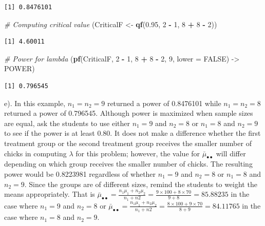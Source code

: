 \documentclass[
]{article}
\newenvironment{Shaded}{\begin{snugshade}}{\end{snugshade}}
\newcommand{\AttributeTok}[1]{\textcolor[rgb]{0.13,0.29,0.53}{#1}}
\newcommand{\CommentTok}[1]{\textcolor[rgb]{0.56,0.35,0.01}{\textit{#1}}}
\newcommand{\ConstantTok}[1]{\textcolor[rgb]{0.56,0.35,0.01}{#1}}
\newcommand{\DecValTok}[1]{\textcolor[rgb]{0.00,0.00,0.81}{#1}}
\newcommand{\FloatTok}[1]{\textcolor[rgb]{0.00,0.00,0.81}{#1}}
\newcommand{\FunctionTok}[1]{\textcolor[rgb]{0.13,0.29,0.53}{\textbf{#1}}}
\newcommand{\NormalTok}[1]{#1}
\newcommand{\OtherTok}[1]{\textcolor[rgb]{0.56,0.35,0.01}{#1}}
\newcommand{\SpecialCharTok}[1]{\textcolor[rgb]{0.81,0.36,0.00}{\textbf{#1}}}
\begin{document}
\begin{verbatim}
[1] 0.8476101
\end{verbatim}

\begin{Shaded}
\begin{Highlighting}[]
\CommentTok{\# Computing critical value}
\NormalTok{(CriticalF }\OtherTok{\textless{}{-}} \FunctionTok{qf}\NormalTok{(}\FloatTok{0.95}\NormalTok{, }\DecValTok{2} \SpecialCharTok{{-}} \DecValTok{1}\NormalTok{, }\DecValTok{8} \SpecialCharTok{+} \DecValTok{8} \SpecialCharTok{{-}} \DecValTok{2}\NormalTok{))}
\end{Highlighting}
\end{Shaded}

\begin{verbatim}
[1] 4.60011
\end{verbatim}

\begin{Shaded}
\begin{Highlighting}[]
\CommentTok{\# Power for lambda}
\NormalTok{(}\FunctionTok{pf}\NormalTok{(CriticalF, }\DecValTok{2} \SpecialCharTok{{-}} \DecValTok{1}\NormalTok{, }\DecValTok{8} \SpecialCharTok{+} \DecValTok{8} \SpecialCharTok{{-}} \DecValTok{2}\NormalTok{, }\DecValTok{9}\NormalTok{, }\AttributeTok{lower =} \ConstantTok{FALSE}\NormalTok{) }\OtherTok{{-}\textgreater{}}\NormalTok{ POWER)}
\end{Highlighting}
\end{Shaded}

\begin{verbatim}
[1] 0.796545
\end{verbatim}

e). In this example, \(n_1 = n_2 = 9\) returned a power of 0.8476101 while \(n_1 = n_2 = 8\) returned a power of 0.796545. Although power is maximized when sample sizes are equal, ask the students to use either \(n_1 = 9\) and \(n_2 = 8\) or \(n_1 = 8\) and \(n_2 = 9\) to see if the power is at least 0.80. It does not make a difference whether the first treatment group or the second treatment group receives the smaller number of chicks in computing \(\lambda\) for this problem; however, the value for \(\bar{\mu}_{\bullet\bullet}\) will differ depending on which group receives the smaller number of chicks. The resulting power would be 0.8223981 regardless of whether \(n_1 = 9\) and \(n_2 = 8\) or \(n_1 = 8\) and \(n_2 = 9\). Since the groups are of different sizes, remind the students to weight the means appropriately. That is \(\bar{\mu}_{\bullet\bullet} = \frac{n_1\mu_1+n_2\mu_2}{n_1+n2} =\frac{9\times 100 + 8 \times 70}{9 + 8}=85.88235\) in the case where \(n_1 = 9\) and \(n_2 = 8\) or \(\bar{\mu}_{\bullet\bullet} = \frac{n_1\mu_1+n_2\mu_2}{n_1+n2} =\frac{8\times 100 + 9\times 70}{8 + 9}=84.11765\) in the case where \(n_1 = 8\) and \(n_2 = 9\).
\end{document}
